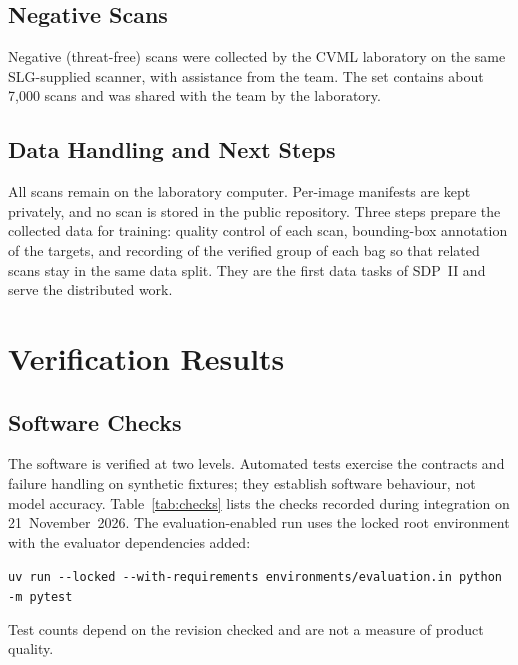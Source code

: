 \subsection{Negative Scans}
Negative (threat-free) scans were collected by the CVML laboratory on the same
SLG-supplied scanner, with assistance from the team. The set contains about
7,000 scans and was shared with the team by the laboratory.

\subsection{Data Handling and Next Steps}
All scans remain on the laboratory computer. Per-image manifests are kept privately,
and no scan is stored in the public repository. Three steps prepare
the collected data for training: quality control of each scan, bounding-box
annotation of the targets, and recording of the verified group of each bag so that
related scans stay in the same data split. They are the first data tasks
of SDP~II and serve the distributed work.

\section{Verification Results}\label{sec:verification}

\subsection{Software Checks}
The software is verified at two levels. Automated tests exercise the contracts
and failure handling on synthetic fixtures; they establish software behaviour,
not model accuracy. Table~\ref{tab:checks} lists the checks recorded during
integration on 21~November~2026. The evaluation-enabled run uses the locked root
environment with the evaluator dependencies added:
\begin{center}\small
\texttt{uv run -{}-locked -{}-with-requirements environments/evaluation.in python -m pytest}
\end{center}
Test counts depend on the revision checked and are not a measure of product
quality.

